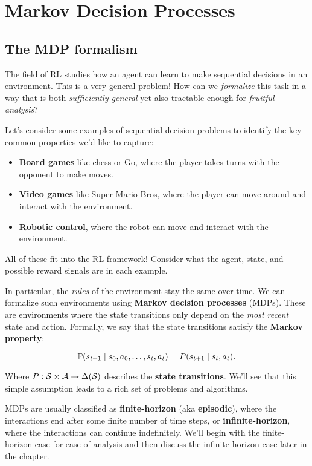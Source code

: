\documentclass[../main/main]{subfiles}
\begin{document}
\chapter{Markov Decision Processes}

\tableofcontents

\section{The MDP formalism}

The field of RL studies how an agent can learn to make sequential decisions in an environment. This is a very general problem! How can we \emph{formalize} this task in a way that is both \emph{sufficiently general} yet also tractable enough for \emph{fruitful analysis}?

Let's consider some examples of sequential decision problems to identify the key common properties we'd like to capture:

\begin{itemize}
    \item \textbf{Board games} like chess or Go, where the player takes turns with the opponent to make moves.
    \item \textbf{Video games} like Super Mario Bros, where the player can move around and interact with the environment.
    \item \textbf{Robotic control}, where the robot can move and interact with the environment.
\end{itemize}


All of these fit into the RL framework! Consider what the agent, state, and possible reward signals are in each example.

In particular, the \emph{rules} of the environment stay the same over time. We can formalize such environments using \textbf{Markov decision processes} (MDPs). These are environments where the state transitions only depend on the \emph{most recent} state and action. Formally, we say that the state transitions satisfy the \textbf{Markov property}:

\[
    \P(s_{t+1} \mid s_0, a_0, \dots, s_t, a_t) = P(s_{t+1} \mid s_t, a_t).
\]

Where $P : \S \times \A \to \Delta(\S)$ describes the \textbf{state transitions}. We'll see that this simple assumption leads to a rich set of problems and algorithms.

MDPs are usually classified as \textbf{finite-horizon} (aka \textbf{episodic}), where the interactions end after some finite number of time steps, or \textbf{infinite-horizon}, where the interactions can continue indefinitely. We'll begin with the finite-horizon case for ease of analysis and then discuss the infinite-horizon case later in the chapter.
\end{document}
